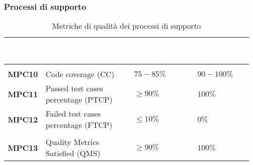 \subsubsection{Processi di supporto}

{
\renewcommand{\arraystretch}{1.5}
\centering
\begin{longtable}{C{2.5cm} | C{5.5cm} | C{3.5cm} | C{3.5cm}}
\textcolor{white}{\textbf{Codice}}&
\textcolor{white}{\textbf{Nome metrica}}&
\textcolor{white}{\textbf{Valore accettabile}}&
\textcolor{white}{\textbf{Valore ottimale}}\\

\endhead
\endfoot
{}\caption{Metriche di qualità dei processi di supporto}
\endlastfoot

 \\

\textbf{MPC10} & Code coverage (CC) & $ 75-85\% $  & $ 90-100 \% $ \\
\textbf{MPC11} & Passed test cases percentage (PTCP) & $ \geq 90\% $  & $ 100 \% $ \\
\textbf{MPC12} & Failed test cases percentage (FTCP) & $ \leq 10\% $  & $ 0 \% $ \\

 \\

\textbf{MPC13} & Quality Metrics Satisfied (QMS) & $\geq 90\% $  & $ 100 \% $ \\

\end{longtable}
}

